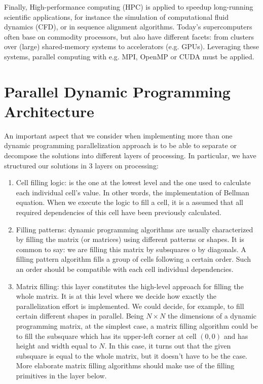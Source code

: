 \documentclass[journal]{IEEEtran}
\begin{document}
Finally, High-performance computing (HPC) is applied to speedup long-running scientific applications, for instance the simulation of computational fluid dynamics (CFD), or in sequence alignment algorithms. Today's supercomputers often base on commodity processors, but also have different facets: from clusters over (large) shared-memory systems to accelerators (e.g. GPUs). Leveraging these systems, parallel computing with e.g. MPI, OpenMP or CUDA must be applied.


\section{Parallel Dynamic Programming Architecture}

An important aspect that we consider when implementing more than one dynamic programming parallelization approach is to be able to separate or decompose the solutions into different layers of processing. In particular, we have structured our solutions in 3 layers on processing:

\begin{enumerate}
    \item Cell filling logic: is the one at the lowest level and the one used to calculate each individual cell's value. In other words, the implementation of Bellman equation. When we execute the logic to fill a cell, it is a assumed that all required dependencies of this cell have been previously calculated.
    \item Filling patterns: dynamic programming algorithms are usually characterized by filling the matrix (or matrices) using different patterns or shapes. It is common to say: we are filling this matrix by subsquares o by diagonals. A filling pattern algorithm fills a group of cells following a certain order. Such an order should be compatible with each cell individual dependencies.
    \item Matrix filling: this layer constitutes the high-level approach for filling the whole matrix. It is at this level where we decide how exactly the parallelization effort is implemented. We could decide, for example, to fill certain different shapes in parallel. Being $N \times N$ the dimensions of a dynamic programming matrix, at the simplest case, a matrix filling algorithm could be to fill the subsquare which has its upper-left corner at cell $(0,0)$ and has height and width equal to $N$. In this case, it turns out that the given subsquare is equal to the whole matrix, but it doesn't have to be the case. More elaborate matrix filling algorithms should make use of the filling primitives in the layer below. 
\end{enumerate}
\end{document}
